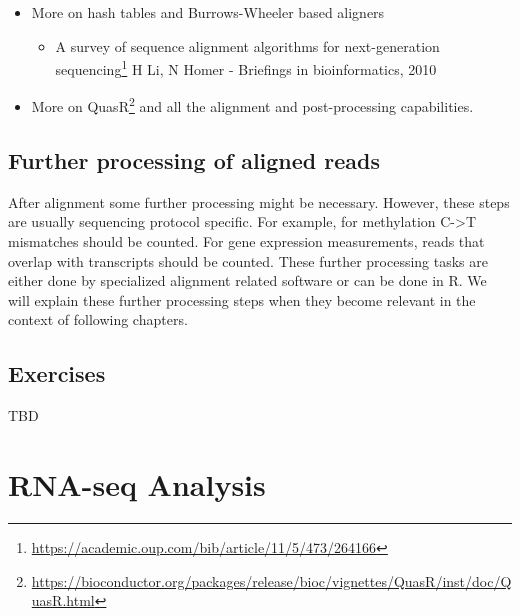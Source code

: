\documentclass[12pt,]{krantz}
\providecommand{\tightlist}{%
  \setlength{\itemsep}{0pt}\setlength{\parskip}{0pt}}
\renewcommand{\href}[2]{#2\footnote{\url{#1}}}
\begin{document}
\begin{itemize}
\tightlist
\item
  More on hash tables and Burrows-Wheeler based aligners

  \begin{itemize}
  \tightlist
  \item
    \href{https://academic.oup.com/bib/article/11/5/473/264166}{A survey of sequence alignment algorithms for next-generation sequencing} H Li, N Homer - Briefings in bioinformatics, 2010
  \end{itemize}
\item
  \href{https://bioconductor.org/packages/release/bioc/vignettes/QuasR/inst/doc/QuasR.html}{More on QuasR} and all the alignment and post-processing capabilities.
\end{itemize}

\hypertarget{further-processing-of-aligned-reads}{%
\section{Further processing of aligned reads}\label{further-processing-of-aligned-reads}}

After alignment some further processing might be necessary. However, these steps are usually sequencing protocol specific. For example, for methylation C-\textgreater{}T mismatches should be counted. For gene expression measurements, reads that overlap with transcripts should be counted. These further processing tasks are either done by specialized alignment related software or can be done in R. We will explain these further processing steps when they become relevant in the context of following chapters.

\hypertarget{exercises-5}{%
\section{Exercises}\label{exercises-5}}

TBD

\hypertarget{rnaseqanalysis}{%
\chapter{RNA-seq Analysis}\label{rnaseqanalysis}}
\end{document}
